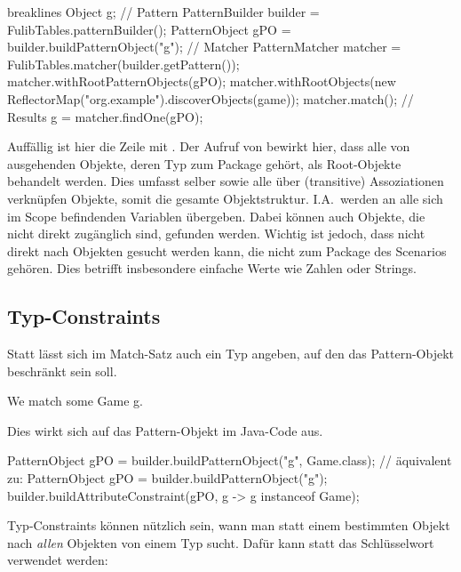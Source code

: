 \begin{jcodeblock*}{breaklines}
    Object g;
    {
        // Pattern
        PatternBuilder builder = FulibTables.patternBuilder();
        PatternObject gPO = builder.buildPatternObject("g");
        // Matcher
        PatternMatcher matcher = FulibTables.matcher(builder.getPattern());
        matcher.withRootPatternObjects(gPO);
        matcher.withRootObjects(new ReflectorMap("org.example").discoverObjects(game));
        matcher.match();
        // Results
        g = matcher.findOne(gPO);
    }
\end{jcodeblock*}

Auffällig ist hier die Zeile mit .
Der Aufruf von  bewirkt hier, dass alle von  ausgehenden Objekte, deren Typ zum Package  gehört, als Root-Objekte behandelt werden.
Dies umfasst  selber sowie alle über (transitive) Assoziationen verknüpfen Objekte,
somit die gesamte Objektstruktur.
I.A.\ werden an  alle sich im Scope befindenden Variablen übergeben.
Dabei können auch Objekte, die nicht direkt zugänglich sind, gefunden werden.
Wichtig ist jedoch, dass nicht direkt nach Objekten gesucht werden kann, die nicht zum Package des Scenarios gehören.
Dies betrifft insbesondere einfache Werte wie Zahlen oder Strings.

\subsection{Typ-Constraints}

Statt  lässt sich im Match-Satz auch ein Typ angeben, auf den das Pattern-Objekt beschränkt sein soll.

\begin{mdcodeblock}
    We match some Game g.
\end{mdcodeblock}

Dies wirkt sich auf das Pattern-Objekt im Java-Code aus.

\begin{jcodeblock}
    PatternObject gPO = builder.buildPatternObject("g", Game.class);
    // äquivalent zu:
    PatternObject gPO = builder.buildPatternObject("g");
    builder.buildAttributeConstraint(gPO, g -> g instanceof Game);
\end{jcodeblock}

Typ-Constraints können nützlich sein, wann man statt einem bestimmten Objekt nach \emph{allen} Objekten von einem Typ sucht.
Dafür kann statt  das Schlüsselwort  verwendet werden:


